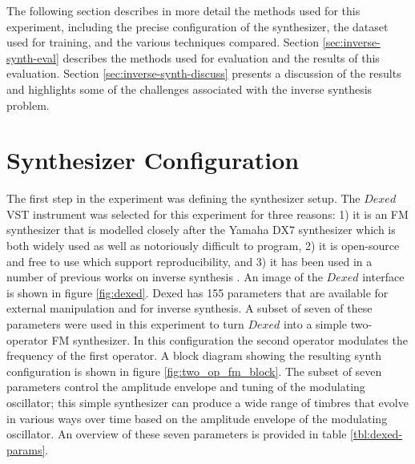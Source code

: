 


The following section describes in more detail the methods used for this experiment, including the precise configuration of the synthesizer, the dataset used for training, and the various techniques compared. Section \ref{sec:inverse-synth-eval} describes the methods used for evaluation and the results of this evaluation. Section \ref{sec:inverse-synth-discuss} presents a discussion of the results and highlights some of the challenges associated with the inverse synthesis problem. %

\section{Synthesizer Configuration}
The first step in the experiment was defining the synthesizer setup. The $Dexed$ VST instrument was selected for this experiment for three reasons: 1) it is an FM synthesizer that is modelled closely after the Yamaha DX7 synthesizer which is both widely used as well as notoriously difficult to program, 2) it is open-source and free to use which support reproducibility, and 3) it has been used in a number of previous works on inverse synthesis \cite{yee2018automatic, luke2019stochastic, le2021improving, masudo2021quality}. An image of the $Dexed$ interface is shown in figure \ref{fig:dexed}. Dexed has 155 parameters that are available for external manipulation and for inverse synthesis. A subset of seven of these parameters were used in this experiment to turn $Dexed$ into a simple two-operator FM synthesizer. In this configuration the second operator modulates the frequency of the first operator. A block diagram showing the resulting synth configuration is shown in figure \ref{fig:two_op_fm_block}. The subset of seven parameters control the amplitude envelope and tuning of the modulating oscillator; this simple synthesizer can produce a wide range of timbres that evolve in various ways over time based on the amplitude envelope of the modulating oscillator. An overview of these seven parameters is provided in table \ref{tbl:dexed-params}.

